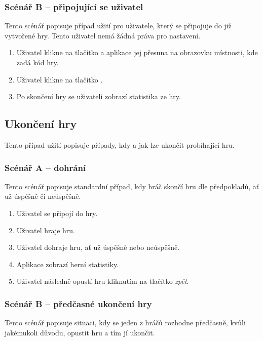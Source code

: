 \subsubsection*{Scénář B -- připojující se uživatel}

Tento scénář popisuje případ užití pro uživatele,
který se připojuje do již vytvořené hry.
Tento uživatel nemá žádná práva pro nastavení.

\begin{enumerate}
    \item Uživatel klikne na tlačítko 
    a aplikace jej přesuna na obrazovku místnosti,
    kde zadá kód hry.
    \item Uživatel klikne na tlačítko .
    \item Po skončení hry se uživateli zobrazí statistika ze hry.
\end{enumerate}

\subsection{Ukončení hry}

Tento případ užití popisuje případy,
kdy a jak lze ukončit probíhající hru.

\subsubsection*{Scénář A -- dohrání}

Tento scénář popisuje standardní případ,
kdy hráč skončí hru dle předpokladů,
ať už úspěšně či neúspěšně.

\begin{enumerate}
    \item Uživatel se připojí do hry.
    \item Uživatel hraje hru.
    \item Uživatel dohraje hru, ať už úspěšně nebo neúspěšně.
    \item Aplikace zobrazí herní statistiky.
    \item Uživatel následně opustí hru kliknutím na tlačítko \emph{zpět}.
\end{enumerate}

\subsubsection*{Scénář B -- předčasné ukončení hry}

Tento scénář popisuje situaci,
kdy se jeden z hráčů rozhodne předčasně,
kvůli jakémukoli důvodu,
opustit hru a tím jí ukončit. 

